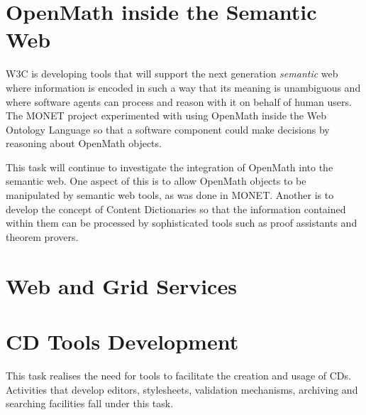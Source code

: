 \documentclass[draft]{artikel3}
\begin{document}
\section{OpenMath inside the Semantic Web}

W3C is developing tools that will support the next generation
\emph{semantic} web where information is encoded in such a way that its
meaning is unambiguous and where software agents can process and reason
with it on behalf of human users.  The MONET project experimented with
using OpenMath inside the Web Ontology Language so that a software
component could make decisions by reasoning about OpenMath objects.

This task will continue to investigate the integration of OpenMath into
the semantic web.  One aspect of this is to allow OpenMath objects to be
manipulated by semantic web tools, as was done in MONET.  Another is to
develop the concept of Content Dictionaries so that the information
contained within them can be processed by sophisticated tools such as
proof assistants and theorem provers.

\section{Web and Grid Services}


\section{CD Tools Development} 
\label{tools}

This task realises the need for tools to facilitate the creation and
usage of CDs. Activities that develop editors, stylesheets, validation
mechanisms, archiving and searching facilities fall under this task.
\end{document}

